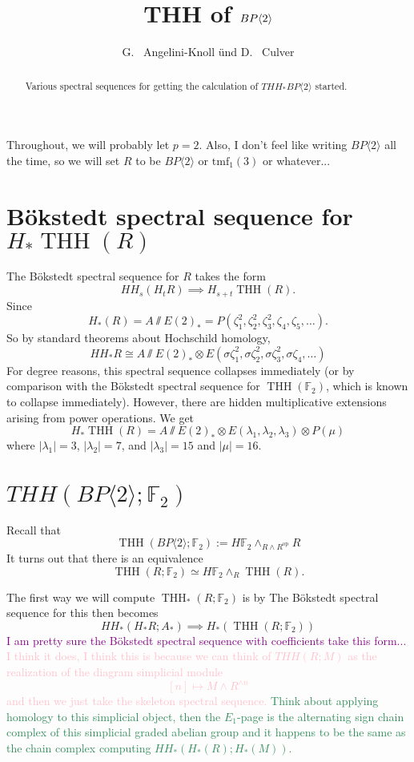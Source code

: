 \documentclass[12pt]{amsart}
\title{THH of $\tBP{2}$}
\author{ G.~ Angelini-Knoll \"und D.~ Culver}\address{University of Illinois, Urbana-Champaign}\email{dculver@nd.edu}\address{Michigan State University, East Lansing}\email{angelini@math.msu.edu}
\newcommand{\mmod}{\! \sslash \!}
\newcommand{\bra}[1]{\langle #1 \rangle}
\newcommand{\F}{\mathbb{F}}
\newcommand{\tBP}[1]{BP\bra{#1}}
\newcommand{\tmf}{\mathrm{tmf}}
\DeclareMathOperator{\THH}{THH}
\def \AE2{A\mmod E(2)_*}
\renewcommand{\AE}[1]{A\mmod E(#1)_*}
\newcommand{\op}{\mathrm{op}}
\theoremstyle{definition}
\numberwithin{equation}{section}
\numberwithin{figure}{section}
\begin{document}
\maketitle

\begin{abstract}
Various spectral sequences for getting the calculation of $THH_*\tBP{2}$ started.
\end{abstract}

\tableofcontents

Throughout, we will probably let $p=2$. Also, I don't feel like writing $\tBP{2}$ all the time, so we will set $R$ to be $\tBP{2}$ or $\tmf_1(3)$ or whatever...

\section{B\"okstedt spectral sequence for $H_*\THH(R)$}

The B\"okstedt spectral sequence for $R$ takes the form 
\[
HH_s(H_tR)\implies H_{s+t}\THH(R).
\]
Since
\[
H_*(R) = \AE{2} = P(\zeta_1^2, \zeta_2^2, \zeta_3^2, \zeta_4, \zeta_5, \ldots).
\]
So by standard theorems about Hochschild homology, 
\[
HH_*R\cong \AE{2}\otimes E(\sigma\zeta_1^2, \sigma\zeta_2^2, \sigma\zeta_3^2, \sigma\zeta_4, \ldots )
\]
For degree reasons, this spectral sequence collapses immediately (or by comparison with the B\"okstedt spectral sequence for $\THH(\F_2)$, which is known to collapse immediately). However, there are hidden multiplicative extensions arising from power operations. We get
\[
H_*\THH(R) = \AE{2}\otimes E(\lambda_1, \lambda_2,\lambda_3)\otimes P(\mu)
\]
where $|\lambda_1| = 3$, $|\lambda_2| = 7$, and $|\lambda_3| = 15$ and $|\mu|=16$.

\section{$THH(\tBP{2};\F_2)$}

Recall that 
\[
\THH(\tBP{2};\F_2) := H\F_2\wedge_{R\wedge R^{\op}} R 
\]
It turns out that there is an equivalence
\[
\THH(R; \F_2)\simeq H\F_2\wedge_R\THH(R).
\]


The first way we will compute $\THH_*(R;\F_2)$ is by The B\"okstedt spectral sequence for this then becomes  %
\[
HH_*(H_*R;A_*)\implies H_*(\THH(R;\F_2))
\]
\textcolor{purple}{I am pretty sure the B\"okstedt spectral sequence with coefficients take this form...}
\textcolor{pink}{I think it does, I think this is because we can think of $THH(R;M)$ as the realization of the diagram simplicial module
\[
[n]\mapsto M\wedge R^{\wedge n}
\]
and then we just take the skeleton spectral sequence.} 
\textcolor{seagreen}{Think about applying homology to this simplicial object, then the $E_1$-page is the alternating sign chain complex of this simplicial graded abelian group and it happens to be the same as the chain complex computing $HH_*(H_*(R);H_*(M)).$}
\end{document}
